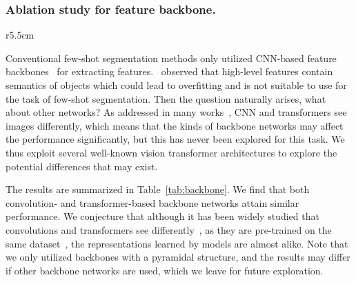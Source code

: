 \subsubsection{Ablation study for feature backbone.}
\begin{wraptable}{r}{5.5cm}
\begin{center}
\end{center}
\vspace{-10pt}\caption{\textbf{Ablation study of different feature backbone. }}\label{tab:backbone}
\end{wraptable}
Conventional few-shot segmentation methods only utilized CNN-based feature backbones~\cite{he2016deep} for extracting features.~\cite{zhang2019canet} observed that high-level features contain semantics of objects which could lead to overfitting and is not suitable to use for the task of few-shot segmentation. Then the question naturally arises, what about other networks? As addressed in many works~\cite{raghu2021vision,dosovitskiy2020image}, CNN and transformers see images differently, which means that the kinds of backbone networks may affect the performance significantly, but this has never been explored for this task. We thus exploit several well-known vision transformer architectures to explore the potential differences that may exist. 

The results are summarized in Table~\ref{tab:backbone}. We find that both convolution- and transformer-based backbone networks attain similar performance. We conjecture that although it has been widely studied that convolutions and transformers see differently~\cite{raghu2021vision}, as they are pre-trained on the same dataset~\cite{deng2009imagenet}, the representations learned by models are almost alike.  Note that we only utilized backbones with a pyramidal structure, and the results may differ if other backbone networks are used, which we leave for future exploration. \vspace{-10pt}




